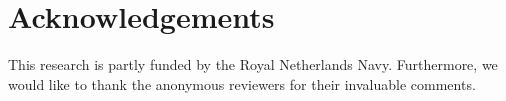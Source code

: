 \documentclass[runningheads]{llncs}
\begin{document}
\section*{Acknowledgements}\label{sec:acknowledgments}
This research is partly funded by the Royal Netherlands Navy.
Furthermore, we would like to thank the anonymous reviewers for their invaluable comments.

%
%
%


%
\end{document}
